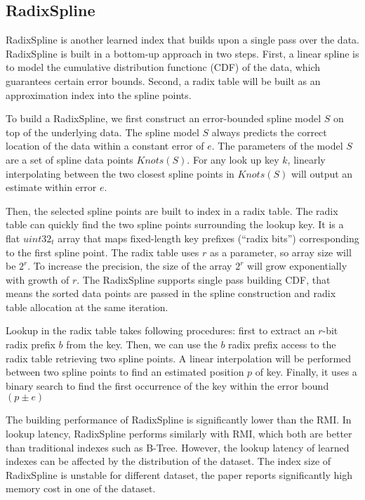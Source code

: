 \subsection{RadixSpline}
RadixSpline \cite{Kipf:2020wr} is another learned index that builds upon a single pass over the data. RadixSpline is built in a bottom-up approach in two steps. First, a linear spline is to model the cumulative distribution functionc (CDF) of the data, which guarantees certain error bounds. Second, a radix table will be built as an approximation index into the spline points. 

To build a RadixSpline, we first construct an error-bounded spline model $S$ on top of the underlying data. The spline model $S$ always predicts the correct location of the data within a constant error of $e$. The parameters of the model $S$ are a set of spline data points $Knots(S)$. For any look up key $k$, linearly interpolating between the two closest spline points in $Knots(S)$ will output an estimate within error $e$. 

Then, the selected spline points are built to index in a radix table. The radix table can quickly find the two spline points surrounding the lookup key. It is a flat $uint32_t$ array that maps fixed-length key prefixes (“radix bits”) corresponding to the first spline point. The radix table uses $r$ as a parameter, so array size will be ${2^r}$. To increase the precision, the size of the array ${2^r}$ will grow exponentially with growth of $r$. The RadixSpline supports single pass building CDF, that means the sorted data points are passed in the spline construction and radix table allocation at the same iteration. 

Lookup in the radix table takes following procedures: first to extract an $r$-bit radix prefix $b$ from the key. Then, we can use the $b$ radix prefix access to the radix table retrieving two spline points. A linear interpolation will be performed between two spline points to find an estimated position $p$ of key. Finally, it uses a binary search to find the first occurrence of the key within the error bound $(p \pm e)$

The building performance of RadixSpline is significantly lower than the RMI. In lookup latency, RadixSpline performs similarly with RMI, which both are better than traditional indexes such as B-Tree. However, the lookup latency of learned indexes can be affected by the distribution of the dataset. The index size of RadixSpline is unstable for different dataset, the paper reports significantly high memory cost in one of the dataset. 

